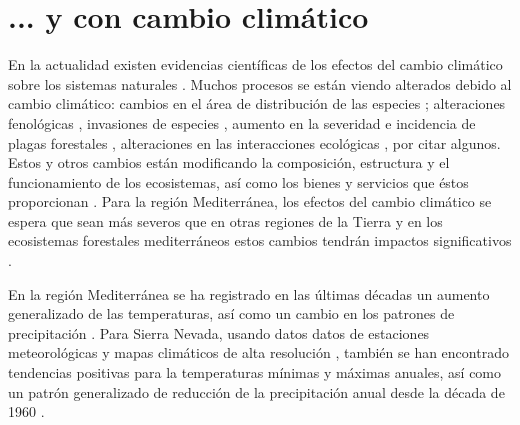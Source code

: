 \section{... y con cambio climático}\label{sec:intro:climate-change}

En la actualidad existen evidencias científicas de los efectos del cambio climático sobre los sistemas naturales \autocites{IPCC2013ClimateChange}. Muchos procesos se están viendo alterados debido al cambio climático: cambios en el área de distribución de las especies \autocites{Thuilleretal2005ClimateChange}; alteraciones fenológicas \autocites{GordoSanz2005PhenologyClimate, EstiartePenuelas2015AlterationPhenology}, invasiones de especies \autocite{GonzalezMorenoetal2014PlantInvasions}, aumento en la severidad e incidencia de plagas forestales \autocites{Hodaretal2012CambioClimatico,HodarZamora2004HerbivoryClimatic}, alteraciones en las interacciones ecológicas \autocites{MontoyaRaffaelli2010ClimateChange}, por citar algunos. Estos y otros cambios están modificando la composición, estructura y el funcionamiento de los ecosistemas, así como los bienes y servicios que éstos proporcionan \autocites{Dingetal2016ValuingClimate}. Para la región Mediterránea, los efectos del cambio climático se espera que sean más severos que en otras regiones de la Tierra \autocites{Giorgi2006ClimateChange,IPCC2013ClimateChange} y en los ecosistemas forestales mediterráneos estos cambios tendrán impactos significativos \autocites{Regato2008AdaptingGlobal,RescodeDiosetal2006ClimateChange,Penuelasetal2017ImpactsGlobal,HerreroZavala2015BosquesBiodiversidad}.  

En la región Mediterránea se ha registrado en las últimas décadas un aumento generalizado de las temperaturas, así como un cambio en los patrones de precipitación \autocites{PerezBoscolo2010ClimateSpain,GiorgiLionello2008ClimateChange,Crameretal2020ClimateEnvironmental}. Para Sierra Nevada, usando datos datos de estaciones meteorológicas y mapas climáticos de alta resolución \autocites{Benitoetal2014ClimateSimulations}, también se han encontrado tendencias positivas para la temperaturas mínimas y máximas anuales, así como un patrón generalizado de reducción de la precipitación anual desde la década de 1960 \autocites{PerezLuqueetal2016SenalesCambio,PerezLuqueetal2021ClimaNevadaBase}.  

